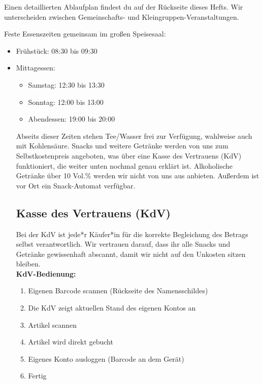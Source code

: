 \documentclass[a5paper,pagesize,twoside,fontsize=8pt,DIV=15]{scrreprt}
\begin{document}







Einen detaillierten Ablaufplan findest du auf der Rückseite dieses Hefts. Wir unterscheiden zwischen Gemeinschafts- und Kleingruppen-Veranstaltungen.

\vspace{-2mm}

Feste Essenszeiten gemeinsam im großen Speisesaal:
\begin{itemize}
\item Frühstück: 08:30 bis 09:30
\item Mittagessen:
\begin{itemize}
    \item Samstag: 12:30 bis 13:30
    \item Sonntag: 12:00 bis 13:00
\item Abendessen: 19:00 bis 20:00
\end{itemize}


Abseits dieser Zeiten stehen Tee/Wasser frei zur Verfügung, wahlweise auch mit Kohlensäure. Snacks und weitere Getränke werden von uns zum Selbstkostenpreis angeboten, was über eine Kasse des Vertrauens (KdV) funktioniert, die weiter unten nochmal genau erklärt ist. Alkoholische Getränke über 10 Vol.\% werden wir nicht von uns aus anbieten. Außerdem ist vor Ort ein Snack-Automat verfügbar.


\subsection*{Kasse des Vertrauens (KdV)}

Bei der KdV ist jede*r Käufer*in für die korrekte Begleichung des Betrags selbst verantwortlich. Wir vertrauen darauf, dass ihr alle Snacks und Getränke gewissenhaft abscannt, damit wir nicht auf den Unkosten sitzen bleiben.\\

\textbf{KdV-Bedienung:}
\begin{enumerate}
    \item Eigenen Barcode scannen (Rückseite des Namensschildes)
    \item Die KdV zeigt aktuellen Stand des eigenen Kontos an
    \item Artikel scannen
    \item Artikel wird direkt gebucht 
    \item Eigenes Konto ausloggen (Barcode an dem Gerät)
    \item Fertig
\end{enumerate}


\end{itemize}
\end{document}
